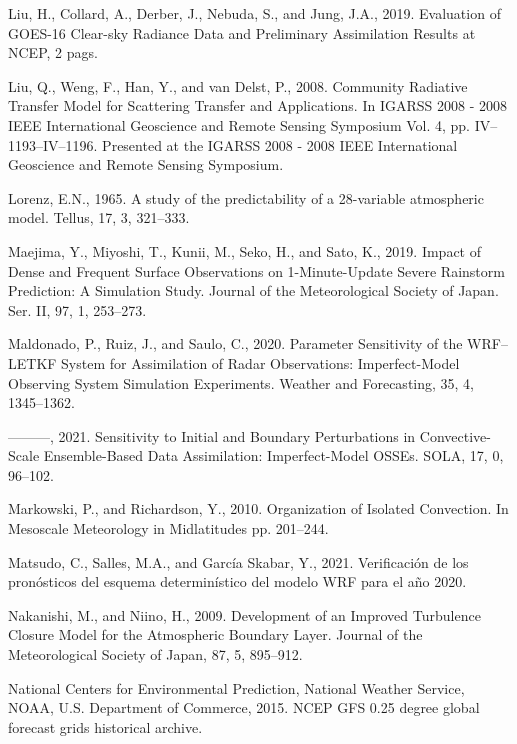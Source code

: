 \documentclass[12pt,oneside,a4paper]{reedthesis}
\begin{document}
\leavevmode\hypertarget{ref-liu2019}{}%
Liu, H., Collard, A., Derber, J., Nebuda, S., and Jung, J.A., 2019. Evaluation of GOES-16 Clear-sky Radiance Data and Preliminary Assimilation Results at NCEP, 2 pags.

\leavevmode\hypertarget{ref-liu2008}{}%
Liu, Q., Weng, F., Han, Y., and van Delst, P., 2008. Community Radiative Transfer Model for Scattering Transfer and Applications. In IGARSS 2008 - 2008 IEEE International Geoscience and Remote Sensing Symposium Vol. 4, pp. IV--1193--IV--1196. Presented at the IGARSS 2008 - 2008 IEEE International Geoscience and Remote Sensing Symposium.

\leavevmode\hypertarget{ref-lorenz1965}{}%
Lorenz, E.N., 1965. A study of the predictability of a 28-variable atmospheric model. Tellus, 17, 3, 321--333.

\leavevmode\hypertarget{ref-maejima2019}{}%
Maejima, Y., Miyoshi, T., Kunii, M., Seko, H., and Sato, K., 2019. Impact of Dense and Frequent Surface Observations on 1-Minute-Update Severe Rainstorm Prediction: A Simulation Study. Journal of the Meteorological Society of Japan. Ser. II, 97, 1, 253--273.

\leavevmode\hypertarget{ref-maldonado2020}{}%
Maldonado, P., Ruiz, J., and Saulo, C., 2020. Parameter Sensitivity of the WRF--LETKF System for Assimilation of Radar Observations: Imperfect-Model Observing System Simulation Experiments. Weather and Forecasting, 35, 4, 1345--1362.

\leavevmode\hypertarget{ref-maldonado2021}{}%
---------, 2021. Sensitivity to Initial and Boundary Perturbations in Convective-Scale Ensemble-Based Data Assimilation: Imperfect-Model OSSEs. SOLA, 17, 0, 96--102.

\leavevmode\hypertarget{ref-markowski2010}{}%
Markowski, P., and Richardson, Y., 2010. Organization of Isolated Convection. In Mesoscale Meteorology in Midlatitudes pp. 201--244.

\leavevmode\hypertarget{ref-matsudo2021}{}%
Matsudo, C., Salles, M.A., and García Skabar, Y., 2021. Verificación de los pronósticos del esquema determinístico del modelo WRF para el año 2020.

\leavevmode\hypertarget{ref-nakanishi2009}{}%
Nakanishi, M., and Niino, H., 2009. Development of an Improved Turbulence Closure Model for the Atmospheric Boundary Layer. Journal of the Meteorological Society of Japan, 87, 5, 895--912.

\leavevmode\hypertarget{ref-cisl_rda_ds084.1}{}%
National Centers for Environmental Prediction, National Weather Service, NOAA, U.S. Department of Commerce, 2015. NCEP GFS 0.25 degree global forecast grids historical archive.
\end{document}
